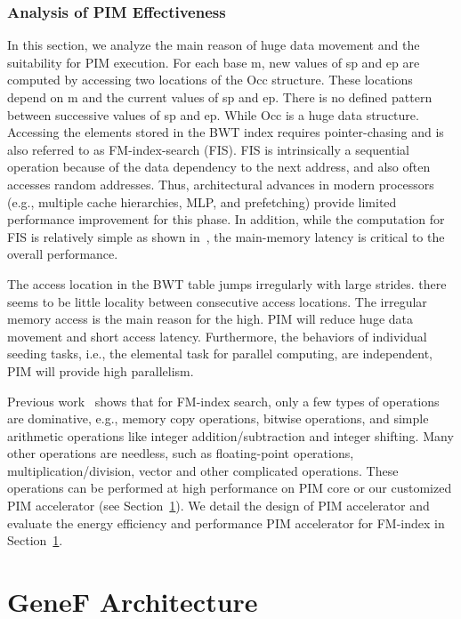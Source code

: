 \documentclass[9pt,conference]{IEEEtran}
\begin{document}

\subsubsection{Analysis of PIM Effectiveness}
In this section, we analyze the main reason of huge data movement and the suitability for PIM execution. For each base m, new values of sp and ep are computed by accessing two locations of the Occ structure. These locations depend on m and the current values of sp and ep. There is no defined pattern between successive values of sp and ep. While Occ is a huge data structure. Accessing the elements stored in the BWT index requires pointer-chasing and is also referred to as FM-index-search (FIS). FIS is intrinsically a sequential operation because of the data dependency to the next address, and also often accesses random addresses. Thus, architectural advances in modern processors (e.g., multiple cache hierarchies, MLP, and prefetching) provide limited performance improvement for this phase. In addition, while the computation for FIS is relatively simple as shown in~\cite{yuanrong}, the main-memory latency is critical to the overall performance.

The access location in the BWT table jumps irregularly with large strides. there seems to be little locality between consecutive access locations. The irregular memory access is the main reason for the high. PIM will reduce huge data movement and short access latency. Furthermore, the behaviors of individual seeding tasks, i.e., the elemental task for parallel computing, are independent, PIM will provide high parallelism.

Previous work~\cite{yuanrong} shows that for FM-index search, only a few types of operations are dominative, e.g., memory copy operations, bitwise operations, and simple arithmetic operations like integer addition/subtraction and integer shifting. Many other operations are needless, such as floating-point operations, multiplication/division, vector and other complicated operations. These operations can be performed at high performance on PIM core or our customized PIM accelerator (see Section~\ref{sec:arch}). We detail the design of PIM accelerator and evaluate the energy efficiency and performance PIM accelerator for FM-index in Section~\ref{sec:arch}.


\section{GeneF Architecture}
\label{sec:arch}
\end{document}
